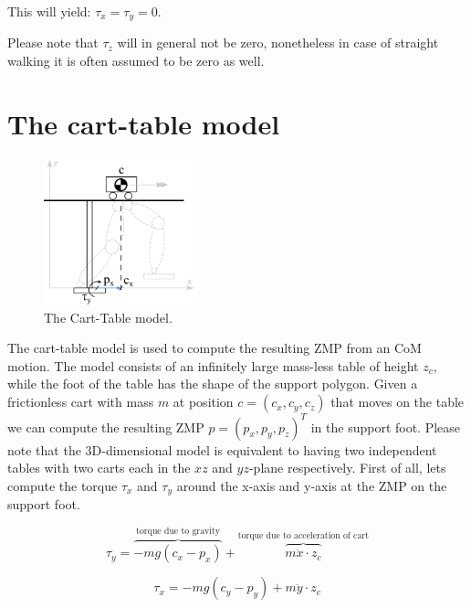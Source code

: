 \documentclass[english,ngerman]{KITreprt}
\begin{document}
This will yield: $\tau_x = \tau_y = 0$.

Please note that $\tau_z$ will in general not be zero, nonetheless in
case of straight walking it is often assumed to be zero as well.

\section{The cart-table model}\label{section:cart-table}

\begin{figure}
  \begin{center}
     \includegraphics[width=0.4\textwidth]{images/carttable.png}
  \end{center}
  \caption{The Cart-Table model.}
\end{figure}

The cart-table model is used to compute the resulting ZMP from an CoM
motion. The model consists of an infinitely large mass-less table of
height $z_c$, while the foot of the table has the shape of the support
polygon. Given a frictionless cart with mass $m$ at position
$c = (c_x, c_y, c_z)$ that moves on the table we can compute the
resulting ZMP $p = (p_x, p_y, p_z)^T$ in the support foot. Please note
that the 3D-dimensional model is equivalent to having two independent
tables with two carts each in the $xz$ and $yz$-plane respectively.
First of all, lets compute the torque $\tau_x$ and $\tau_y$ around the
x-axis and y-axis at the ZMP on the support foot.

\begin{equation}
\tau_y = \overbrace{-m g (c_x - p_x)}^{\text{torque due to gravity}} + \overbrace{m \ddot{x} \cdot z_c}^{\text{torque due to acceleration of cart}}
\end{equation}

\begin{equation}
\tau_x = -m g (c_y - p_y) + m \ddot{y} \cdot z_c
\end{equation}
\end{document}
